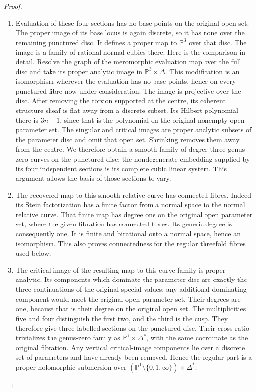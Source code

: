 \documentclass[11pt,a4paper]{article}
\theoremstyle{definition}
\begin{document}
\begin{proof}
\begin{enumerate}[label=\arabic*.]
\item Evaluation of these four sections has no base points on the
original open set. The proper image of its base locus is
again discrete, so it has none over the remaining punctured
disc. It defines a proper map to $\mathbb P^3$ over that
disc. The image is a family of rational normal cubics there.
Here is the comparison in detail. Resolve the graph of the
meromorphic evaluation map over the full disc and take its
proper analytic image in $\mathbb P^3\times\Delta$.
This modification is an isomorphism wherever the evaluation
has no base points, hence on every punctured fibre now under
consideration. The image is projective over the disc. After
removing the torsion supported at the centre, its coherent
structure sheaf is flat away from a discrete subset. Its
Hilbert polynomial there is $3n+1$, since that is the
polynomial on the original nonempty open parameter set.
The singular and critical images are proper analytic subsets
of the parameter disc and omit that open set. Shrinking
removes them away from the centre. We therefore obtain a
smooth family of degree-three genus-zero curves on the
punctured disc; the nondegenerate embedding supplied by its
four independent sections is its complete cubic linear system.
This argument allows the basis of those sections to vary.

\item The recovered map to this smooth relative curve has connected
fibres. Indeed its Stein factorization has a finite factor
from a normal space to the normal relative curve. That finite
map has degree one on the original open parameter set, where
the given fibration has connected fibres. Its generic degree
is consequently one. It is finite and birational onto a normal
space, hence an isomorphism. This also proves connectedness
for the regular threefold fibres used below.

\item The critical image of the resulting map to this curve family
is proper analytic. Its components which dominate the
parameter disc are exactly the three continuations of the
original special values: any additional dominating component
would meet the original open parameter set. Their degrees
are one, because that is their degree on the original open
set. The multiplicities five and four distinguish the first
two, and the third is the cusp. They therefore give three
labelled sections on the punctured disc. Their cross-ratio
trivializes the genus-zero family as
$\mathbb P^1\times\Delta^*$, with the same coordinate as
the original fibration. Any vertical critical-image components
lie over a discrete set of parameters and have already been
removed. Hence the regular part is a proper holomorphic
submersion over
$(\mathbb P^1\setminus\{0,1,\infty\})\times\Delta^*$.


\end{enumerate}
\end{proof}
\end{document}
